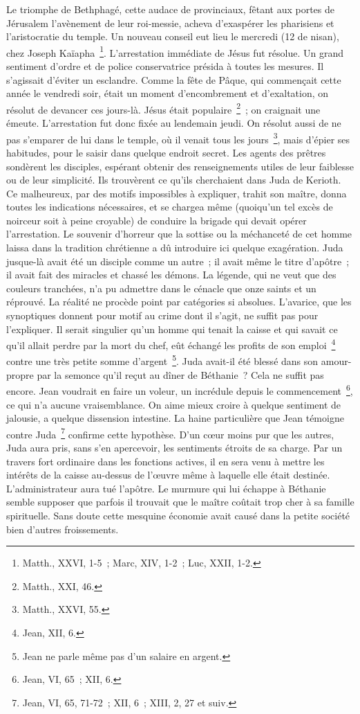 \documentclass[french,twoside]{book} %
\begin{document}
Le triomphe de Bethphagé, cette audace de provinciaux, fêtant aux portes de Jérusalem l’avènement de leur roi-messie, acheva d’exaspérer les pharisiens et l’aristocratie du temple. Un nouveau conseil eut lieu le mercredi (12 de nisan), chez Joseph Kaïapha \footnote{Matth., XXVI, 1-5 ; Marc, XIV, 1-2 ; Luc, XXII, 1-2.}. L’arrestation immédiate de Jésus fut résolue. Un grand sentiment d’ordre et de police conservatrice présida à toutes les mesures. Il s’agissait d’éviter un esclandre. Comme la fête de Pâque, qui commençait cette année le vendredi soir, était un moment d’encombrement et d’exaltation, on résolut de devancer ces jours-là. Jésus était populaire \footnote{Matth., XXI, 46.} ; on craignait une émeute. L’arrestation fut donc fixée au lendemain jeudi. On résolut aussi de ne pas s’emparer de lui dans le temple, où il venait tous les jours \footnote{Matth., XXVI, 55.}, mais d’épier ses habitudes, pour le saisir dans quelque endroit secret. Les agents des prêtres sondèrent les disciples, espérant obtenir des renseignements utiles de leur faiblesse ou de leur simplicité. Ils trouvèrent ce qu’ils cherchaient dans Juda de Kerioth. Ce malheureux, par des motifs impossibles à expliquer, trahit son maître, donna toutes les indications nécessaires, et se chargea même (quoiqu’un tel excès de noirceur soit à peine croyable) de conduire la brigade qui devait opérer l’arrestation. Le souvenir d’horreur que la sottise ou la méchanceté de cet homme laissa dans la tradition chrétienne a dû introduire ici quelque exagération. Juda jusque-là avait été un disciple comme un autre ; il avait même le titre d’apôtre ; il avait fait des miracles et chassé les démons. La légende, qui ne veut que des couleurs tranchées, n’a pu admettre dans le cénacle que onze saints et un réprouvé. La réalité ne procède point par catégories si absolues. L’avarice, que les synoptiques donnent pour motif au crime dont il s’agit, ne suffit pas pour l’expliquer. Il serait singulier qu’un homme qui tenait la caisse et qui savait ce qu’il allait perdre par la mort du chef, eût échangé les profits de son emploi \footnote{Jean, XII, 6.} contre une très petite somme d’argent \footnote{Jean ne parle même pas d’un salaire en argent.}. Juda avait-il été blessé dans son amour-propre par la semonce qu’il reçut au dîner de Béthanie ? Cela ne suffit pas encore. Jean voudrait en faire un voleur, un incrédule depuis le commencement \footnote{Jean, VI, 65 ; XII, 6.}, ce qui n’a aucune vraisemblance. On aime mieux croire à quelque sentiment de jalousie, a quelque dissension intestine. La haine particulière que Jean témoigne contre Juda \footnote{Jean, VI, 65, 71-72 ; XII, 6 ; XIII, 2, 27 et suiv.} confirme cette hypothèse. D’un cœur moins pur que les autres, Juda aura pris, sans s’en apercevoir, les sentiments étroits de sa charge. Par un travers fort ordinaire dans les fonctions actives, il en sera venu à mettre les intérêts de la caisse au-dessus de l’œuvre même à laquelle elle était destinée. L’administrateur aura tué l’apôtre. Le murmure qui lui échappe à Béthanie semble supposer que parfois il trouvait que le maître coûtait trop cher à sa famille spirituelle. Sans doute cette mesquine économie avait causé dans la petite société bien d’autres froissements.\par
\end{document}

